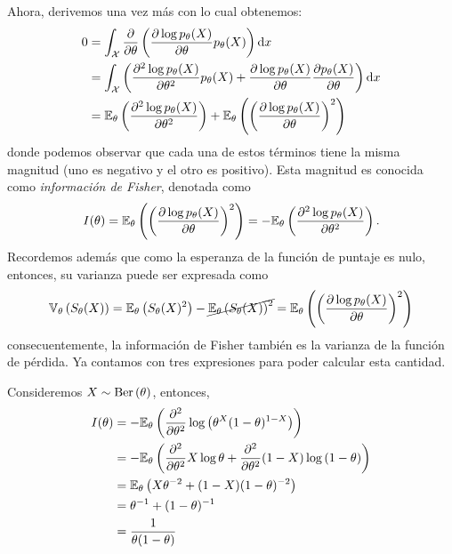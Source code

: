 Ahora, derivemos una vez más con lo cual obtenemos: 
\begin{align*}
	0 &= \int_{\mathcal X} \frac{\partial}{\partial \theta }\left(\frac{\partial \log   p_\theta(X)}{\partial\theta} p_\theta(X) \right){\text{d}x}\\ 
	&= \int_{\mathcal X} \left(\frac{\partial^2 \log   p_\theta(X)}{\partial\theta^2} p_\theta(X) + \frac{\partial \log   p_\theta(X)}{\partial\theta}\frac{\partial   p_\theta(X)}{\partial\theta}  \right){\text{d}x}\\
	&= \mathbb{E}_\theta \left(\frac{\partial^2 \log   p_\theta(X)}{\partial\theta^2}\right) + \mathbb{E}_\theta \left(\left(\frac{\partial \log   p_\theta(X)}{\partial\theta}\right)^2\right)
\end{align*}
donde podemos observar que cada una de estos términos tiene la misma magnitud (uno es negativo y el otro es positivo). Esta magnitud es conocida como \textit{información de Fisher}, denotada como 
\begin{equation}
		I(\theta) = \mathbb{E}_\theta \left(\left(\frac{\partial \log   p_\theta(X)}{\partial\theta}\right)^2\right) = 	-\mathbb{E}_\theta \left(\frac{\partial^2 \log   p_\theta(X)}{\partial\theta^2}\right).
\end{equation}	
Recordemos además que como la esperanza de la función de puntaje es nulo, entonces, su varianza puede ser expresada como 
\begin{equation}
	\mathbb{V}_\theta \left(S_\theta(X)\right) = \mathbb{E}_\theta \left(S_\theta(X)^2\right) - \cancel{\mathbb{E}_\theta \left(S_\theta(X)\right)^2} = \mathbb{E}_\theta \left(\left(\frac{\partial \log   p_\theta(X)}{\partial\theta}\right)^2\right)
\end{equation}
consecuentemente, la información de Fisher también es la varianza de la función de pérdida. Ya contamos con tres expresiones para poder calcular esta cantidad. 

\begin{exercise}
	Consideremos $X\sim\text{Ber}\left(\theta\right)$, entonces, 
	\begin{align}
		I(\theta) &= -\mathbb{E}_\theta \left(\frac{\partial^2}{\partial\theta^2}\log\left(\theta^X(1-\theta)^{1-X}\right)\right)\nonumber\\
		&= -\mathbb{E}_\theta \left(\frac{\partial^2}{\partial\theta^2} X\log\theta + \frac{\partial^2}{\partial\theta^2} 	(1-X)\log\left(1-\theta\right)	\right)\nonumber\\
		&= \mathbb{E}_\theta \left(X\theta^{-2} + (1-X)(1-\theta)^{-2}	\right)\nonumber\\
		&= \theta^{-1} + (1-\theta)^{-1}	\nonumber\\
		&= 	\frac{1}{\theta(1-\theta)}	
	\end{align}
\end{exercise}

